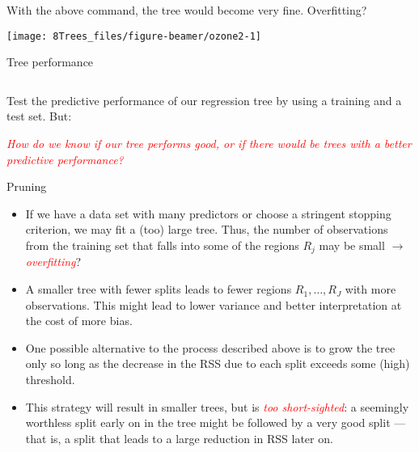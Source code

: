 \documentclass[10pt,ignorenonframetext,]{beamer}
\begin{document}
\begin{frame}

With the above command, the tree would become very fine. Overfitting?

\begin{center}\texttt{[image: 8Trees\_files/figure-beamer/ozone2-1]} \end{center}

\end{frame}

\begin{frame}

\begin{block}{Tree performance}

\(~\)

Test the predictive performance of our regression tree by using a
training and a test set. But:

\vspace{2mm}

\vspace{1mm}

\normalsize

\emph{\textcolor{red}{How do we know if our tree performs good, or if there would be trees with a better predictive performance?}}

\end{block}

\end{frame}

\begin{frame}{Pruning}
\protect\hypertarget{pruning}{}

\begin{itemize}
\item
  If we have a data set with many predictors or choose a stringent
  stopping criterion, we may fit a (too) large tree. Thus, the number of
  observations from the training set that falls into some of the regions
  \(R_j\) may be small \(\rightarrow\)
  \emph{\textcolor{red}{overfitting}}?
\item
  A smaller tree with fewer splits leads to fewer regions
  \(R_1, \ldots, R_J\) with more observations. This might lead to lower
  variance and better interpretation at the cost of more bias.
\item
  One possible alternative to the process described above is to grow the
  tree only so long as the decrease in the RSS due to each split exceeds
  some (high) threshold.
\item
  This strategy will result in smaller trees, but is
  \emph{\textcolor{red}{too short-sighted}}: a seemingly worthless split
  early on in the tree might be followed by a very good split --- that
  is, a split that leads to a large reduction in RSS later on.
\end{itemize}

\end{frame}
\end{document}
